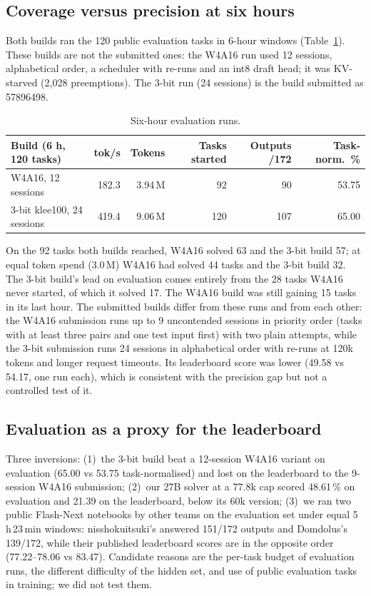 \documentclass[11pt]{article}
\begin{document}
\subsection{Coverage versus precision at six hours}\label{sec:six}
Both builds ran the 120 public evaluation tasks in 6-hour windows (Table~\ref{tab:six}). These builds are not the submitted ones: the W4A16 run used 12 sessions, alphabetical order, a scheduler with re-runs and an int8 draft head; it was KV-starved (2{,}028 preemptions). The 3-bit run (24 sessions) is the build submitted as 57896498.
\begin{table}[t]
\centering\small
\begin{tabular}{@{}lrrrrr@{}}
\toprule
Build (6 h, 120 tasks) & tok/s & Tokens & Tasks started & Outputs /172 & Task-norm.\ \% \\
\midrule
W4A16, 12 sessions & 182.3 & 3.94\,M & 92 & 90 & 53.75 \\
3-bit klee100, 24 sessions & 419.4 & 9.06\,M & 120 & 107 & 65.00 \\
\bottomrule
\end{tabular}
\caption{Six-hour evaluation runs.}
\label{tab:six}
\end{table}
On the 92 tasks both builds reached, W4A16 solved 63 and the 3-bit build 57; at equal token spend (3.0\,M) W4A16 had solved 44 tasks and the 3-bit build 32. The 3-bit build's lead on evaluation comes entirely from the 28 tasks W4A16 never started, of which it solved 17. The W4A16 build was still gaining 15 tasks in its last hour.
The submitted builds differ from these runs and from each other: the W4A16 submission runs up to 9 uncontended sessions in priority order (tasks with at least three pairs and one test input first) with two plain attempts, while the 3-bit submission runs 24 sessions in alphabetical order with re-runs at 120k tokens and longer request timeouts. Its leaderboard score was lower (49.58 vs 54.17, one run each), which is consistent with the precision gap but not a controlled test of it.

\subsection{Evaluation as a proxy for the leaderboard}
Three inversions: (1)~the 3-bit build beat a 12-session W4A16 variant on evaluation (65.00 vs 53.75 task-normalised) and lost on the leaderboard to the 9-session W4A16 submission; (2)~our 27B solver at a 77.8k cap scored 48.61\,\% on evaluation and 21.39 on the leaderboard, below its 60k version; (3)~we ran two public Flash-Next notebooks by other teams on the evaluation set under equal 5\,h\,23\,min windows: nisshokuitsuki's \cite{ni2026} answered 151/172 outputs and Domdolus's \cite{domdolus2026} 139/172, while their published leaderboard scores are in the opposite order (77.22--78.06 vs 83.47). Candidate reasons are the per-task budget of evaluation runs, the different difficulty of the hidden set, and use of public evaluation tasks in training; we did not test them.
\end{document}
